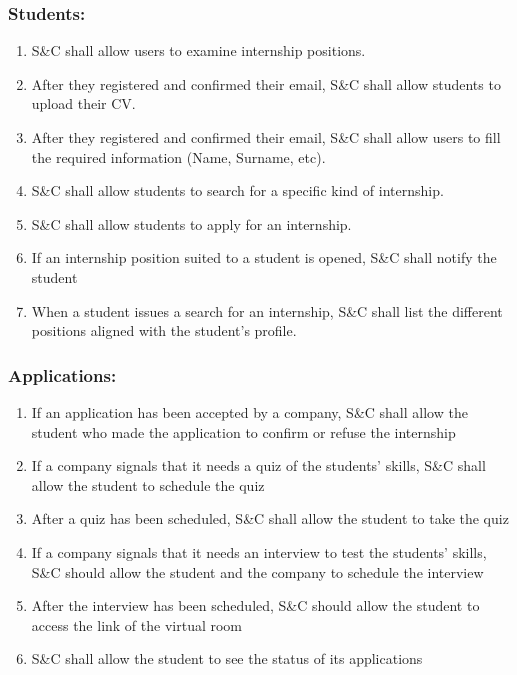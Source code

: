     \subsubsection*{Students:}
        \begin{enumerate}[label=\textbf{R\arabic*},resume]
            \item S\&C shall allow users to examine internship positions.
            \item After they registered and confirmed their email, S\&C shall allow students to upload their CV.   %
            \item After they registered and confirmed their email, S\&C shall allow users to fill the required information (Name, Surname, etc).
            \item S\&C shall allow students to search for a specific kind of internship.    %
            \item S\&C shall allow students to apply for an internship.                     %
            \item If an internship position suited to a student is opened, S\&C shall notify the student
            \item When a student issues a search for an internship, S\&C shall list the different positions aligned with the student's profile.         %
    
            
        \end{enumerate}
    
    \subsubsection*{Applications:}
        \begin{enumerate}[label=\textbf{R\arabic*},resume]
            \item If an application has been accepted by a company, S\&C shall allow the student who made the application to confirm or refuse the internship
            \item If a company signals that it needs a quiz of the students' skills, S\&C shall allow the student to schedule the quiz
            \item After a quiz has been scheduled, S\&C shall allow the student to take the quiz
            \item If a company signals that it needs an interview to test the students' skills, S\&C should allow the student and the company to schedule the interview
            \item After the interview has been scheduled, S\&C should allow the student to access the link of the virtual room
            \item S\&C shall allow the student to see the status of its applications
            
        \end{enumerate}
    
